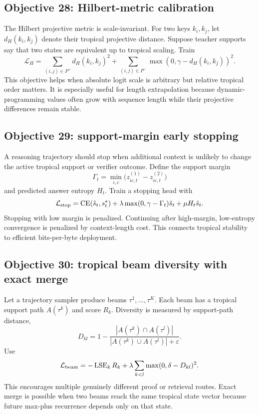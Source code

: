 \documentclass[11pt]{article}
\newcommand{\calL}{\mathcal{L}}
\newcommand{\eps}{\varepsilon}
\begin{document}
\subsection{Objective 28: Hilbert-metric calibration}
The Hilbert projective metric is scale-invariant. For two keys $k_i,k_j$, let $d_H(k_i,k_j)$ denote their tropical projective distance. Suppose teacher supports say that two states are equivalent up to tropical scaling. Train
\begin{equation}
\calL_H=\sum_{(i,j)\in P^+}d_H(k_i,k_j)^2+\sum_{(i,j)\in P^-}\max(0,\gamma-d_H(k_i,k_j))^2.
\end{equation}
This objective helps when absolute logit scale is arbitrary but relative tropical order matters. It is especially useful for length extrapolation because dynamic-programming values often grow with sequence length while their projective differences remain stable.

\subsection{Objective 29: support-margin early stopping}
A reasoning trajectory should stop when additional context is unlikely to change the active tropical support or verifier outcome. Define the support margin
\begin{equation}
\Gamma_t=\min_{i,c}\bigl(z^{(1)}_{ic,t}-z^{(2)}_{ic,t}\bigr)
\end{equation}
and predicted answer entropy $H_t$. Train a stopping head with
\begin{equation}
\calL_{\rm stop}=\operatorname{CE}(\hat s_t,s_t^\star)+\lambda\max(0,\gamma-\Gamma_t)\hat s_t+\mu H_t\hat s_t.
\end{equation}
Stopping with low margin is penalized. Continuing after high-margin, low-entropy convergence is penalized by context-length cost. This connects tropical stability to efficient bits-per-byte deployment.

\subsection{Objective 30: tropical beam diversity with exact merge}
Let a trajectory sampler produce beams $\tau^1,\ldots,\tau^K$. Each beam has a tropical support path $A(\tau^k)$ and score $R_k$. Diversity is measured by support-path distance,
\begin{equation}
D_{kl}=1-\frac{|A(\tau^k)\cap A(\tau^l)|}{|A(\tau^k)\cup A(\tau^l)|+\eps}.
\end{equation}
Use
\begin{equation}
\calL_{\rm beam}=-\operatorname{LSE}_k R_k+\lambda\sum_{k<l}\max(0,\delta-D_{kl})^2.
\end{equation}
This encourages multiple genuinely different proof or retrieval routes. Exact merge is possible when two beams reach the same tropical state vector because future max-plus recurrence depends only on that state.
\end{document}
